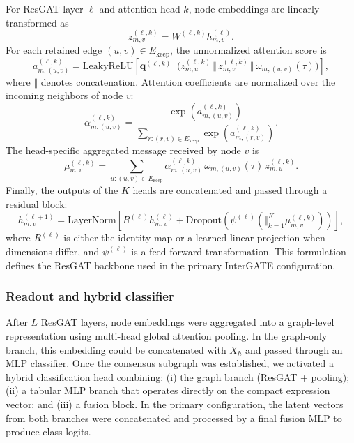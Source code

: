 \documentclass[unnumsec,webpdf,modern,large]{oup-authoring-template}
\begin{document}
For ResGAT layer \(\ell\) and attention head \(k\), node embeddings are linearly transformed as
\[
z^{(\ell,k)}_{m,v}=W^{(\ell,k)}h^{(\ell)}_{m,v}.
\]
For each retained edge \((u,v)\in E_{\mathrm{keep}}\), the unnormalized attention score is
\[
a^{(\ell,k)}_{m,(u,v)}=
\mathrm{LeakyReLU}\!\left[
\mathbf{q}^{(\ell,k)\top}
\Big(z^{(\ell,k)}_{m,u}\,\Vert\,z^{(\ell,k)}_{m,v}\,\Vert\,\omega_{m,(u,v)}(\tau)\Big)
\right],
\]
where \(\Vert\) denotes concatenation. Attention coefficients are normalized over the incoming neighbors of node \(v\):
\[
\alpha^{(\ell,k)}_{m,(u,v)}=
\frac{\exp\left(a^{(\ell,k)}_{m,(u,v)}\right)}{\sum_{r:(r,v)\in E_{\mathrm{keep}}}\exp\left(a^{(\ell,k)}_{m,(r,v)}\right)}.
\]
The head-specific aggregated message received by node \(v\) is
\[
\mu^{(\ell,k)}_{m,v}=
\sum_{u:(u,v)\in E_{\mathrm{keep}}}
\alpha^{(\ell,k)}_{m,(u,v)}\,\omega_{m,(u,v)}(\tau)\,z^{(\ell,k)}_{m,u}.
\]
Finally, the outputs of the \(K\) heads are concatenated and passed through a residual block:
\[
h^{(\ell+1)}_{m,v}=\mathrm{LayerNorm}\!\left[
R^{(\ell)}h^{(\ell)}_{m,v}+\mathrm{Dropout}\!\left(
\psi^{(\ell)}\!\left(\Vert_{k=1}^{K}\mu^{(\ell,k)}_{m,v}\right)
\right)
\right],
\]
where \(R^{(\ell)}\) is either the identity map or a learned linear projection when dimensions differ, and \(\psi^{(\ell)}\) is a feed-forward transformation. This formulation defines the ResGAT backbone used in the primary InterGATE configuration.

\subsubsection{Readout and hybrid classifier}
After \(L\) ResGAT layers, node embeddings were aggregated into a graph-level representation using multi-head global attention pooling. In the graph-only branch, this embedding could be concatenated with \(X_h\) and passed through an MLP classifier. Once the consensus subgraph was established, we activated a hybrid classification head combining: (i) the graph branch (ResGAT + pooling); (ii) a tabular MLP branch that operates directly on the compact expression vector; and (iii) a fusion block. In the primary configuration, the latent vectors from both branches were concatenated and processed by a final fusion MLP to produce class logits. 
\end{document}
